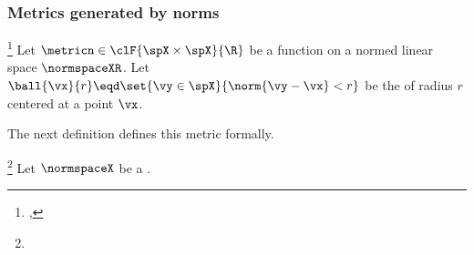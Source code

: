 \subsubsection{Metrics generated by norms}
\begin{theorem}
\label{thm:d=norm}
\footnote{
  ,
  }
Let $\metricn\in\clF{\spX\times\spX}{\R}$ be a function on a  normed linear space $\normspaceXR$.
Let $\ball{\vx}{r}\eqd\set{\vy\in\spX}{\norm{\vy-\vx}<r}$ be the   of radius $r$ centered at a point $\vx$.
\end{theorem}

The next definition defines this metric formally.
\begin{definition}
\label{def:d=norm}
\footnote{
  }
Let $\normspaceX$ be a  .
\\
\end{definition}


